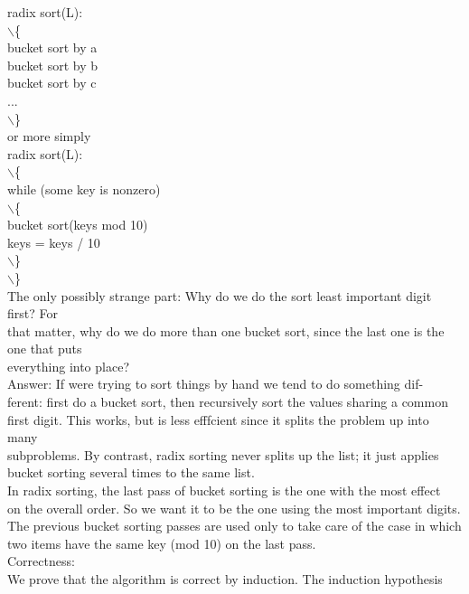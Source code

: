 \documentclass[a4paper,11pt]{article}
\begin{document}
\begin{flushleft}
{
radix sort(L):
\\ $\backslash$\{
\\ bucket sort by a
\\ bucket sort by b
\\ bucket sort by c
\\ ...
\\ $\backslash$\}
\\ or more simply
\\ radix sort(L):
\\ $\backslash$\{
\\ while (some key is nonzero)
\\ $\backslash$\{
\\ bucket sort(keys mod 10)
\\ keys = keys / 10
\\ $\backslash$\}
\\ $\backslash$\}
\\ }
{
\raggedleft
The only possibly strange part: Why do we do the sort least important digit first? For
\\ that matter, why do we do more than one bucket sort, since the last one is the one that puts
\\ }
{
everything into place?
\\ }
{
\raggedleft
Answer: If were trying to sort things by hand we tend to do something dif-
\\ ferent: first do a bucket sort, then recursively sort the values sharing a common
\\ first digit. This works, but is less efffcient since it splits the problem up into many
\\ subproblems. By contrast, radix sorting never splits up the list; it just applies
\\ }
{
bucket sorting several times to the same list.
\\ }
{
\raggedleft
In radix sorting, the last pass of bucket sorting is the one with the most effect
\\ on the overall order. So we want it to be the one using the most important digits.
\\ The previous bucket sorting passes are used only to take care of the case in which
\\ }
{
two items have the same key (mod 10) on the last pass.
\\ Correctness:
\\ }
{
\raggedleft
We prove that the algorithm is correct by induction. The induction hypothesis
}
\end{flushleft}
\end{document}
